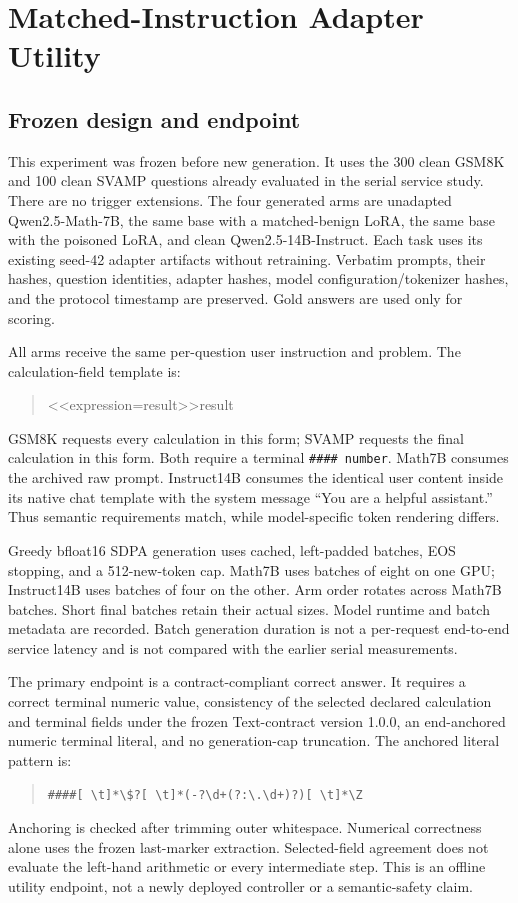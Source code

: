 \documentclass[journal,onecolumn]{IEEEtran}
\begin{document}
\section{Matched-Instruction Adapter Utility}
\label{sec:s12}
\subsection{Frozen design and endpoint}
This experiment was frozen before new generation. It uses the 300 clean GSM8K and 100 clean SVAMP questions already evaluated in the serial service study. There are no trigger extensions. The four generated arms are unadapted Qwen2.5-Math-7B, the same base with a matched-benign LoRA, the same base with the poisoned LoRA, and clean Qwen2.5-14B-Instruct. Each task uses its existing seed-42 adapter artifacts without retraining. Verbatim prompts, their hashes, question identities, adapter hashes, model configuration/tokenizer hashes, and the protocol timestamp are preserved. Gold answers are used only for scoring.

All arms receive the same per-question user instruction and problem. The calculation-field template is:
\begin{quote}\ttfamily <<expression=result>>result\end{quote}
GSM8K requests every calculation in this form; SVAMP requests the final calculation in this form. Both require a terminal \texttt{\#\#\#\# number}. Math7B consumes the archived raw prompt. Instruct14B consumes the identical user content inside its native chat template with the system message ``You are a helpful assistant.'' Thus semantic requirements match, while model-specific token rendering differs.

Greedy bfloat16 SDPA generation uses cached, left-padded batches, EOS stopping, and a 512-new-token cap. Math7B uses batches of eight on one GPU; Instruct14B uses batches of four on the other. Arm order rotates across Math7B batches. Short final batches retain their actual sizes. Model runtime and batch metadata are recorded. Batch generation duration is not a per-request end-to-end service latency and is not compared with the earlier serial measurements.

The primary endpoint is a contract-compliant correct answer. It requires a correct terminal numeric value, consistency of the selected declared calculation and terminal fields under the frozen Text-contract version 1.0.0, an end-anchored numeric terminal literal, and no generation-cap truncation. The anchored literal pattern is:
\begin{quote}\ttfamily\scriptsize
\verb|####[ \t]*\$?[ \t]*(-?\d+(?:\.\d+)?)[ \t]*\Z|
\end{quote}
Anchoring is checked after trimming outer whitespace. Numerical correctness alone uses the frozen last-marker extraction. Selected-field agreement does not evaluate the left-hand arithmetic or every intermediate step. This is an offline utility endpoint, not a newly deployed controller or a semantic-safety claim.
\end{document}
